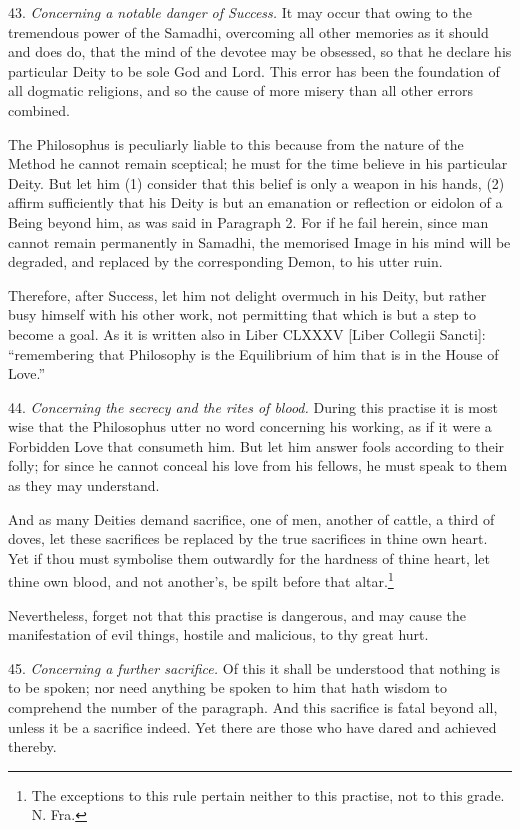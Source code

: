43. \textit{Concerning a notable danger of Success.} It may occur that owing to the tremendous power of the Samadhi, overcoming all other memories as it should and does do, that the mind of the devotee may be obsessed, so that he declare his particular Deity to be sole God and Lord. This error has been the foundation of all dogmatic religions, and so the cause of more misery than all other errors combined.

The Philosophus is peculiarly liable to this because from the nature of the Method he cannot remain sceptical; he must for the time believe in his particular Deity. But let him (1) consider that this belief is only a weapon in his hands, (2) affirm sufficiently that his Deity is but an emanation or reflection or eidolon of a Being beyond him, as was said in Paragraph 2. For if he fail herein, since man cannot remain permanently in Samadhi, the memorised Image in his mind will be degraded, and replaced by the corresponding Demon, to his utter ruin.

Therefore, after Success, let him not delight overmuch in his Deity, but rather busy himself with his other work, not permitting that which is but a step to become a goal. As it is written also in Liber CLXXXV [Liber Collegii Sancti]: \enquote{remembering that Philosophy is the Equilibrium of him that is in the House of Love.}

44. \textit{Concerning the secrecy and the rites of blood.} During this practise it is most wise that the Philosophus utter no word concerning his working, as if it were a Forbidden Love that consumeth him. But let him answer fools according to their folly; for since he cannot conceal his love from his fellows, he must speak to them as they may understand.

And as many Deities demand sacrifice, one of men, another of cattle, a third of doves, let these sacrifices be replaced by the true sacrifices in thine own heart. Yet if thou must symbolise them outwardly for the hardness of thine heart, let thine own blood, and not another's, be spilt before that altar.\footnote{The exceptions to this rule pertain neither to this practise, not to this grade. N. Fra. \Argentium{}} 

Nevertheless, forget not that this practise is dangerous, and may cause the manifestation of evil things, hostile and malicious, to thy great hurt.

45. \textit{Concerning a further sacrifice.} Of this it shall be understood that nothing is to be spoken; nor need anything be spoken to him that hath wisdom to comprehend the number of the paragraph. And this sacrifice is fatal beyond all, unless it be a sacrifice indeed. Yet there are those who have dared and achieved thereby.

